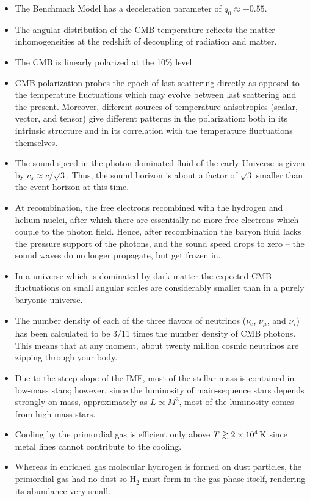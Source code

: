\documentclass[a4paper,11pt]{article}
\begin{document}
\begin{itemize}
    \item The Benchmark Model has a deceleration parameter of $q_0\approx−0.55$.
    \item The angular distribution of the CMB temperature reflects the matter inhomogeneities at the redshift of decoupling of radiation and matter.
    \item The CMB is linearly polarized at the 10\% level.
    \item CMB polarization probes the epoch of last scattering directly as opposed to the temperature fluctuations which may evolve between last scattering and the present. Moreover, different sources of temperature anisotropies (scalar, vector, and tensor) give different patterns in the polarization: both in its intrinsic structure and in its correlation with the temperature fluctuations themselves.
    \item The sound speed in the photon-dominated fluid of the early Universe is given by $c_s\approx c/\sqrt{3}$. Thus, the sound horizon is about a factor of $\sqrt{3}$ smaller than the event horizon at this time.
    \item At recombination, the free electrons recombined with the hydrogen and helium nuclei, after which there are essentially no more free electrons which couple to the photon field. Hence, after recombination the baryon fluid lacks the pressure support of the photons, and the sound speed drops to zero -- the sound waves do no longer propagate, but get frozen in.
    \item In a universe which is dominated by dark matter the expected CMB fluctuations on small angular scales are considerably smaller than in a purely baryonic universe.
    \item The number density of each of the three flavors of neutrinos ($\nu_e$, $\nu_\mu$, and $\nu_\tau$) has been calculated to be 3/11 times the number density of CMB photons. This means that at any moment, about twenty million cosmic neutrinos are zipping through your body.
    \item Due to the steep slope of the IMF, most of the stellar mass is contained in low-mass stars; however, since the luminosity of main-sequence stars depends strongly on mass, approximately as $L\propto M^3$, most of the luminosity comes from high-mass stars.
    \item Cooling by the primordial gas is efficient only above $T\gtrsim2\times10^4\,{\rm K}$ since metal lines cannot contribute to the cooling.
    \item Whereas in enriched gas molecular hydrogen is formed on dust particles, the primordial gas had no dust so H$_2$ must form in the gas phase itself, rendering its abundance very small.

\end{itemize}
\end{document}
